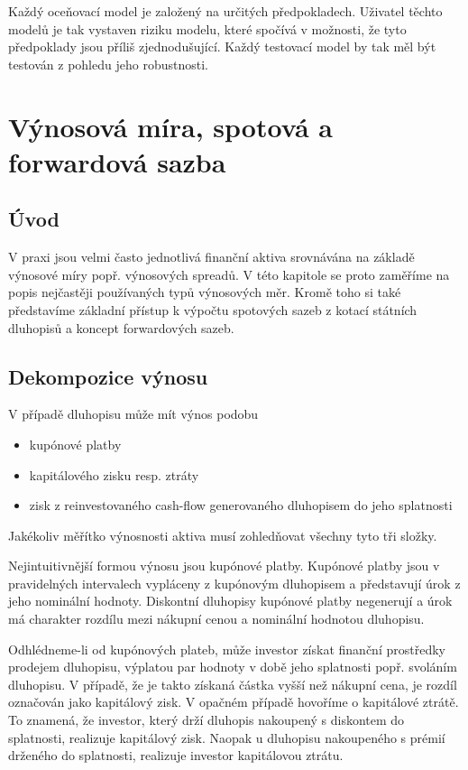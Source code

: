 \documentclass[a4paper]{book}
\begin{document}
Každý oceňovací model je založený na určitých předpokladech. Uživatel těchto modelů je tak vystaven riziku modelu, které spočívá v možnosti, že tyto předpoklady jsou příliš zjednodušující. Každý testovací model by tak měl být testován z pohledu jeho robustnosti.

\chapter{Výnosová míra, spotová a forwardová sazba}

\section{Úvod}

V praxi jsou velmi často jednotlivá finanční aktiva srovnávána na základě výnosové míry popř. výnosových spreadů. V této kapitole se proto zaměříme na popis nejčastěji používaných typů výnosových měr. Kromě toho si také představíme základní přístup k výpočtu spotových sazeb z kotací státních dluhopisů a koncept forwardových sazeb.

\section{Dekompozice výnosu}

V případě dluhopisu může mít výnos podobu
\begin{itemize}
\item kupónové platby
\item kapitálového zisku resp. ztráty
\item zisk z reinvestovaného cash-flow generovaného dluhopisem do jeho splatnosti
\end{itemize}
Jakékoliv měřítko výnosnosti aktiva musí zohledňovat všechny tyto tři složky.

Nejintuitivnější formou výnosu jsou kupónové platby. Kupónové platby jsou v pravidelných intervalech vypláceny z kupónovým dluhopisem a představují úrok z jeho nominální hodnoty. Diskontní dluhopisy kupónové platby negenerují a úrok má charakter rozdílu mezi nákupní cenou a nominální hodnotou dluhopisu.

Odhlédneme-li od kupónových plateb, může investor získat finanční prostředky prodejem dluhopisu, výplatou par hodnoty v době jeho splatnosti popř. svoláním dluhopisu. V případě, že je takto získaná částka vyšší než nákupní cena, je rozdíl označován jako kapitálový zisk. V opačném případě hovoříme o kapitálové ztrátě. To znamená, že investor, který drží dluhopis nakoupený s diskontem do splatnosti, realizuje kapitálový zisk. Naopak u dluhopisu nakoupeného s prémií drženého do splatnosti, realizuje investor kapitálovou ztrátu.
\end{document}
